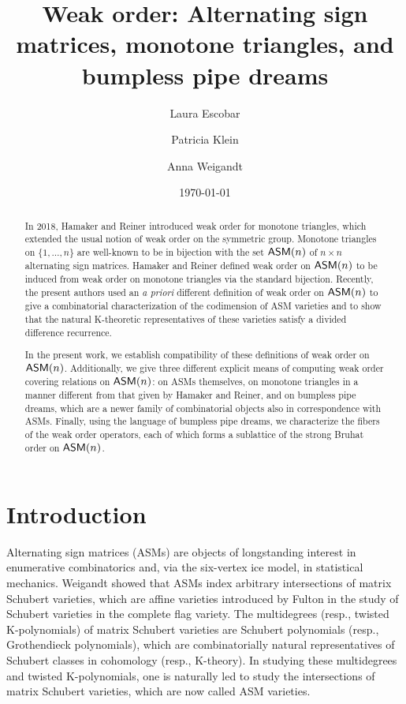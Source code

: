 \documentclass[12 pt]{amsart}
\title[Weak order: ASMs, MTs, and BPDs]{Weak order: Alternating sign matrices, monotone triangles, and bumpless pipe dreams}
\author{Laura Escobar}
\author{Patricia Klein}
\author{Anna Weigandt}
\date{\today}
\numberwithin{equation}{section}
\theoremstyle{remark}
\newcommand{\asm}{{\sf ASM}}
\begin{document}
\begin{abstract}
In 2018, Hamaker and Reiner introduced weak order for monotone triangles, which extended the usual notion of weak order on the symmetric group. Monotone triangles on $\{1, \ldots, n\}$ are well-known to be in bijection with the set $\asm(n)$ of $n \times n$ alternating sign matrices. Hamaker and Reiner defined weak order on $\asm(n)$ to be induced from weak order on monotone triangles via the standard bijection. Recently, the present authors used an \emph{a priori} different definition of weak order on $\asm(n)$ to give a combinatorial characterization of the codimension of ASM varieties and to show that the natural K-theoretic representatives of these varieties satisfy a divided difference recurrence. 

In the present work, we establish compatibility of these definitions of weak order on $\asm(n)$. Additionally, we give three different explicit means of computing weak order covering relations on $\asm(n)$: on ASMs themselves, on monotone triangles in a manner different from that given by Hamaker and Reiner, and on bumpless pipe dreams, which are a newer family of combinatorial objects also in correspondence with ASMs. Finally, using the language of bumpless pipe dreams, we characterize the fibers of the weak order operators, each of which forms a sublattice of the strong Bruhat order on $\asm(n)$.
\end{abstract}


\maketitle
\tableofcontents

\section{Introduction}\label{sec:intro}

Alternating sign matrices (ASMs) are objects of longstanding interest in enumerative combinatorics and, via the six-vertex ice model, in statistical mechanics.  Weigandt \cite{Wei17} showed that ASMs index arbitrary intersections of matrix Schubert varieties, which are affine varieties introduced by Fulton \cite{Ful92} in the study of Schubert varieties in the complete flag variety.  The multidegrees (resp., twisted K-polynomials) of matrix Schubert varieties are Schubert polynomials \cite{KM05} (resp., Grothendieck polynomials), which are combinatorially natural representatives of Schubert classes in cohomology (resp., K-theory).  In studying these multidegrees and twisted K-polynomials, one is naturally led to study the intersections of matrix Schubert varieties, which are now called ASM varieties.
\end{document}

